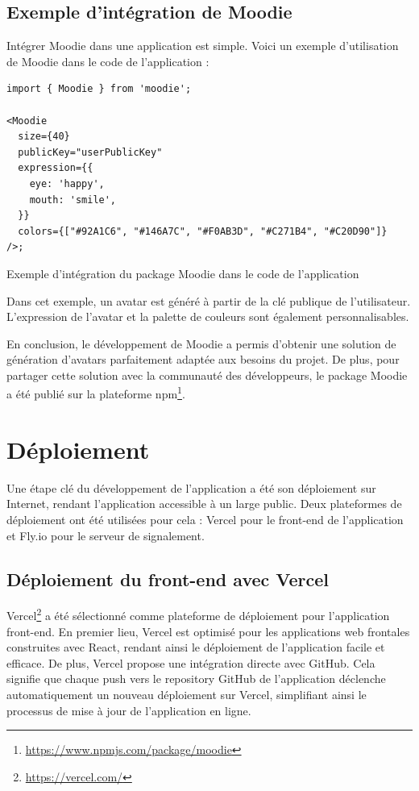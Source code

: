 \subsection{Exemple d'intégration de Moodie}

Intégrer Moodie dans une application est simple. Voici un exemple d'utilisation de Moodie dans le code de l'application :

\begin{listing}[H]
    \begin{verbatim}
import { Moodie } from 'moodie';

<Moodie
  size={40}
  publicKey="userPublicKey"
  expression={{
    eye: 'happy',
    mouth: 'smile',
  }}
  colors={["#92A1C6", "#146A7C", "#F0AB3D", "#C271B4", "#C20D90"]}
/>;
  \end{verbatim}
    \caption{Exemple d'intégration du package Moodie dans le code de l'application}
\end{listing}

Dans cet exemple, un avatar est généré à partir de la clé publique de l'utilisateur. L'expression de l'avatar et la palette de couleurs sont également personnalisables.

En conclusion, le développement de Moodie a permis d'obtenir une solution de génération d'avatars parfaitement adaptée aux besoins du projet. De plus, pour partager cette solution avec la communauté des développeurs, le package Moodie a été publié sur la plateforme npm\footnote{\url{https://www.npmjs.com/package/moodie}}.

\section{Déploiement}

Une étape clé du développement de l'application a été son déploiement sur Internet, rendant l'application accessible à un large public. Deux plateformes de déploiement ont été utilisées pour cela : Vercel pour le front-end de l'application et Fly.io pour le serveur de signalement.

\subsection{Déploiement du front-end avec Vercel}

Vercel\footnote{\url{https://vercel.com/}} a été sélectionné comme plateforme de déploiement pour l'application front-end. En premier lieu, Vercel est optimisé pour les applications web frontales construites avec React, rendant ainsi le déploiement de l'application facile et efficace. De plus, Vercel propose une intégration directe avec GitHub. Cela signifie que chaque push vers le repository GitHub de l'application déclenche automatiquement un nouveau déploiement sur Vercel, simplifiant ainsi le processus de mise à jour de l'application en ligne.

